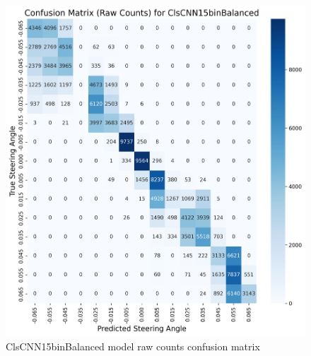 \begin{figure}[H]
\centering
\includegraphics[width=1\linewidth]{Figures/Results/cm_raw_ClsCNN15binBalanced.png}
\caption{ClsCNN15binBalanced model raw counts confusion matrix}
\label{fig:cm_raw_ClsCNN15binBalanced}
\end{figure}


